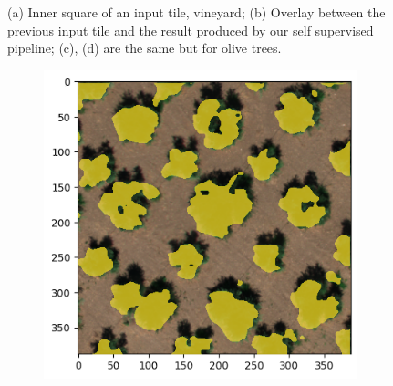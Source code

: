 \documentclass[comsoc,final]{IEEEtran}
\begin{document}
\begin{figure}
\begin{subfigure}[b]{0.45\columnwidth}
         \caption{}
         \label{maskplot:d}
     \end{subfigure}%
%        
     \caption{(a) Inner square of an input tile, vineyard; (b) Overlay between the previous input tile and the result produced by our self supervised pipeline; 
     (c), (d) are the same but for olive trees.}
     \label{fig:input_gt}%
\end{figure}

\begin{figure}{\centering%
      \begin{subfigure}[b]{0.45\columnwidth}
         \centering \includegraphics[width=\columnwidth]{ULIVO0INF}
     \end{subfigure}%
%
      \begin{subfigure}[b]{0.45\columnwidth}

\end{subfigure}}
\end{figure}
\end{document}
